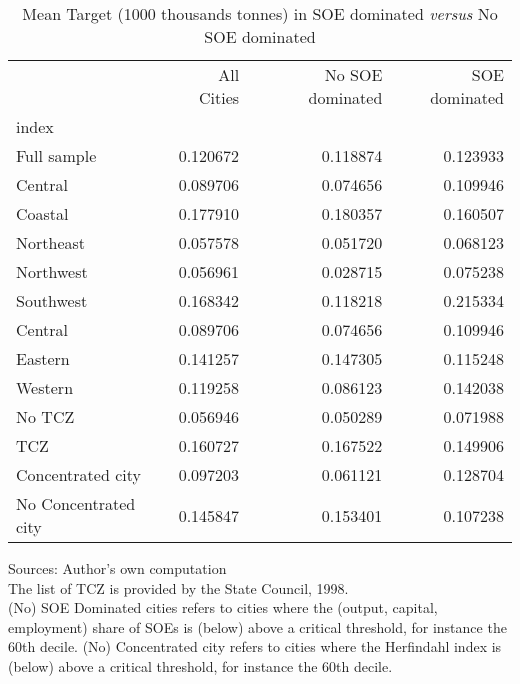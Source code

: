 \documentclass[12pt]{article}
\begin{document}
\begin{table}[!htb] \centering
\caption{\\ Mean Target (1000 thousands tonnes) in SOE dominated \textit{versus} No SOE dominated}
\label{table_4}
\begin{adjustbox}{width=\textwidth, totalheight=\baselineskip,keepaspectratio}
\begin{tabular}{lrrr}
\toprule
{} & All Cities & No SOE dominated & SOE dominated \\
index                &            &                  &               \\
\midrule
Full sample          &   0.120672 &         0.118874 &      0.123933 \\
Central              &   0.089706 &         0.074656 &      0.109946 \\
Coastal              &   0.177910 &         0.180357 &      0.160507 \\
Northeast            &   0.057578 &         0.051720 &      0.068123 \\
Northwest            &   0.056961 &         0.028715 &      0.075238 \\
Southwest            &   0.168342 &         0.118218 &      0.215334 \\
Central              &   0.089706 &         0.074656 &      0.109946 \\
Eastern              &   0.141257 &         0.147305 &      0.115248 \\
Western              &   0.119258 &         0.086123 &      0.142038 \\
No TCZ               &   0.056946 &         0.050289 &      0.071988 \\
TCZ                  &   0.160727 &         0.167522 &      0.149906 \\
Concentrated city    &   0.097203 &         0.061121 &      0.128704 \\
No Concentrated city &   0.145847 &         0.153401 &      0.107238 \\
\bottomrule
\end{tabular}
\end{adjustbox}
\begin{tablenotes} 
 \small 
 \item 
Sources: Author's own computation \\
The list of TCZ is provided by the State Council, 1998. \\
(No) SOE Dominated cities refers to cities where the 
(output, capital, employment) share of SOEs is (below) above a critical threshold, for instance the 60th decile. (No) Concentrated city refers to cities where the Herfindahl index is (below) above a critical threshold, for instance the 60th decile.
\end{tablenotes}
\end{table}
\end{document}
